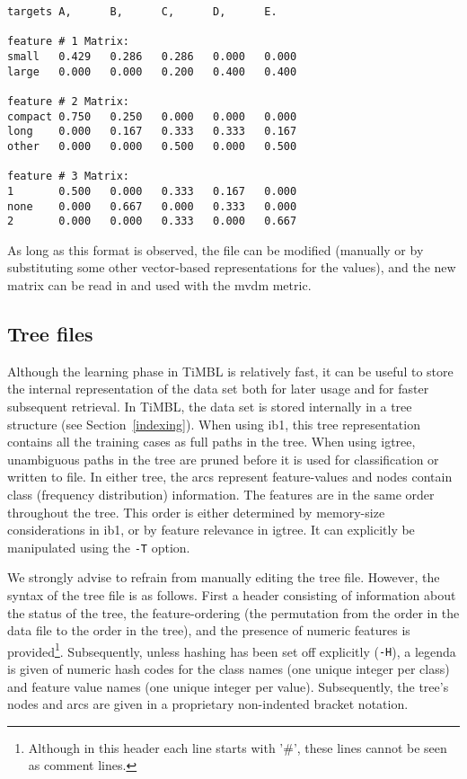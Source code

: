 \documentclass{report}
\begin{document}
\begin{footnotesize}
\begin{verbatim}
targets A,      B,      C,      D,      E.

feature # 1 Matrix: 
small   0.429   0.286   0.286   0.000   0.000
large   0.000   0.000   0.200   0.400   0.400
 
feature # 2 Matrix: 
compact 0.750   0.250   0.000   0.000   0.000
long    0.000   0.167   0.333   0.333   0.167
other   0.000   0.000   0.500   0.000   0.500
 
feature # 3 Matrix: 
1       0.500   0.000   0.333   0.167   0.000
none    0.000   0.667   0.000   0.333   0.000
2       0.000   0.000   0.333   0.000   0.667
\end{verbatim}
\end{footnotesize}

As long as this format is observed, the file can be modified (manually
or by substituting some other vector-based representations for the
values), and the new matrix can be read in and used with the {\sc
mvdm} metric.

\subsection{Tree files}
\label{treeformat}

Although the learning phase in TiMBL is relatively fast, it can be
useful to store the internal representation of the data set both for
later usage and for faster subsequent retrieval. In TiMBL, the data
set is stored internally in a tree structure (see
Section~\ref{indexing}). When using {\sc ib1}, this tree
representation contains all the training cases as full paths in the
tree. When using {\sc igtree}, unambiguous paths in the tree are
pruned before it is used for classification or written to file. In
either tree, the arcs represent feature-values and nodes contain class
(frequency distribution) information. The features are in the same
order throughout the tree. This order is either determined by
memory-size considerations in {\sc ib1}, or by feature relevance in
{\sc igtree}. It can explicitly be manipulated using the {\tt -T}
option.

We strongly advise to refrain from manually editing the tree
file. However, the syntax of the tree file is as follows. First a
header consisting of information about the status of the tree, the
feature-ordering (the permutation from the order in the data file to
the order in the tree), and the presence of numeric features is
provided\footnote{Although in this header each line starts with '\#',
these lines cannot be seen as comment lines.}. Subsequently, unless
hashing has been set off explicitly ({\tt -H}), a legenda is given of
numeric hash codes for the class names (one unique integer per class)
and feature value names (one unique integer per value).  Subsequently,
the tree's nodes and arcs are given in a proprietary non-indented
bracket notation.
\end{document}
